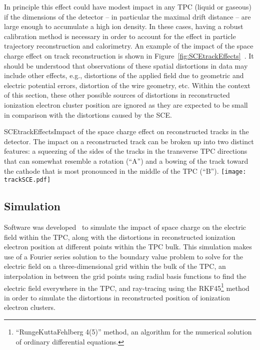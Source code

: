 In principle this effect could have modest impact in any TPC (liquid or gaseous) if the dimensions of the detector -- in particular the maximal drift distance -- are large enough to accumulate a high ion density.  In these cases, having a robust calibration method is necessary in order to account for the effect in particle trajectory reconstruction and calorimetry.  An example of the impact of the space charge effect on track reconstruction is shown in Figure~\ref{fig:SCEtrackEffects}~\cite{Mooney:2015kke}.  It should be understood that observations of these spatial distortions in data may include other effects, e.g., distortions of the applied field due to geometric and electric potential errors, distortion of the wire geometry, etc.  Within the context of this section, these other possible sources of distortions in reconstructed ionization electron cluster position are ignored as they are expected to be small in comparison with the distortions caused by the SCE.

\begin{cdrfigure}{SCEtrackEffects}{Impact of the space charge effect on reconstructed tracks in the detector.  The impact on a reconstructed track can be broken up into two distinct features:  a squeezing of the sides of the tracks in the transverse TPC directions that can somewhat resemble a rotation (``A'') and a bowing of the track toward the cathode that is most pronounced in the middle of the TPC (``B'').}
\texttt{[image: trackSCE.pdf]}
\end{cdrfigure}


\subsection{Simulation} \label{sec:SCEsim}

Software was developed~\cite{SCEsimNote} to simulate the impact of space charge on the electric field within the TPC, along with the distortions in reconstructed ionization electron position at different points within the TPC bulk.  This simulation makes use of a Fourier series solution to the boundary value problem to solve for the electric field on a three-dimensional grid within the bulk of the TPC, an interpolation in between the grid points using radial basis functions to find the electric field everywhere in the TPC, and ray-tracing using the RKF45\footnote{``RungeKuttaFehlberg 4(5)'' method, an algorithm for the numerical solution of ordinary differential equations.} method in order to simulate the distortions in reconstructed position of ionization electron clusters.

